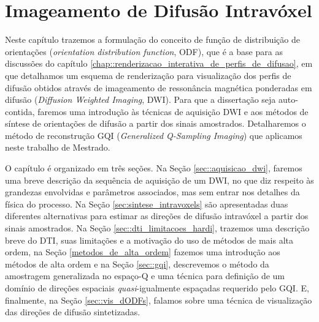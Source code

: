 \documentclass[
    12pt,                %
    oneside,            %
    a4paper,            %
    english,            %
    french,                %
    spanish,            %
    brazil                %
    ]{abntex2}
\begin{document}
\chapter{Imageamento de Difusão Intravóxel}
\label{chapter::metodos_hardi}

Neste capítulo trazemos a formulação do conceito de função de distribuição de orientações (\textit{orientation distribution function}, ODF), que é a base para as discussões do capítulo \ref{chap::renderizacao_interativa_de_perfis_de_difusao}, em que detalhamos um esquema de renderização para visualização dos perfis de difusão obtidos através de imageamento de ressonância magnética ponderadas em difusão (\textit{Diffusion Weighted Imaging}, DWI). Para que a dissertação seja auto-contida, faremos uma introdução às técnicas de aquisição DWI e aos métodos de síntese de orientações de difusão a partir dos sinais amostrados. Detalharemos o método de reconstrução GQI (\textit{Generalized Q-Sampling Imaging}) que aplicamos neste trabalho de Mestrado.

O capítulo é organizado em três seções. Na Seção \ref{sec::aquisicao_dwi}, faremos uma breve descrição da sequência de aquisição de um DWI, no que diz respeito às grandezas envolvidas e parâmetros associados, mas sem entrar nos detalhes da física do processo. Na Seção \ref{sec:sintese_intravoxels} são apresentadas duas diferentes alternativas para estimar as direções de difusão intravóxel  a partir dos sinais amostrados. Na Seção \ref{sec::dti_limitacoes_hardi}, trazemos uma descrição breve do DTI, suas limitações e a motivação do uso de métodos de mais alta ordem, na Seção \ref{metodos_de_alta_ordem} fazemos uma introdução aos métodos de alta ordem e na Seção \ref{sec::gqi}, descrevemos o método da amostragem generalizada no espaço-Q e uma técnica para definição de um domínio de direções espaciais \textit{quasi}-igualmente espaçadas requerido pelo GQI. E, finalmente, na Seção \ref{sec::vis_dODFs}, falamos sobre uma técnica de visualização das direções de difusão sintetizadas. %
\end{document}
